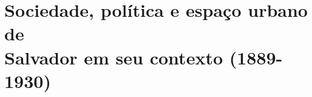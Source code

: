 \chapter[Sociedade, política e espaço urbano de Salvador em seu contexto (1889-1930)]{Sociedade, política e espaço urbano de \\Salvador em seu contexto (1889-1930)}\label{cap:1}






